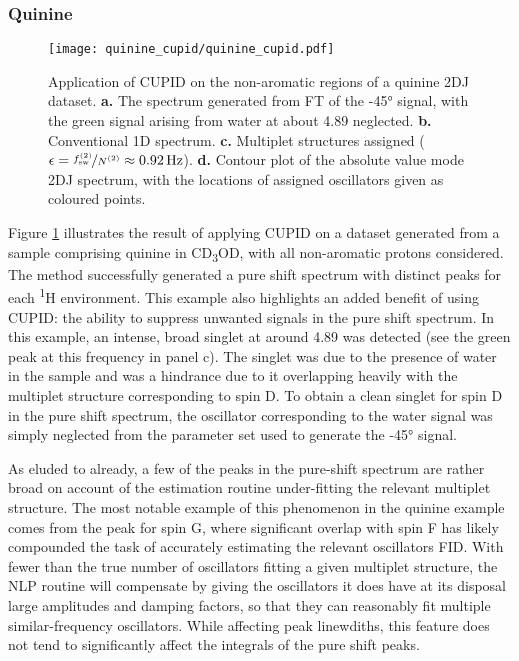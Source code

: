 \subsubsection{Quinine}
\begin{figure}
    \centering
    \texttt{[image: quinine\_cupid/quinine\_cupid.pdf]}
    \caption[
        Application of \acs{CUPID} on the non-aromatic regions of a quinine
        \acs{2DJ} dataset.
    ]{
        Application of \ac{CUPID} on the non-aromatic regions of a quinine
        \ac{2DJ} dataset.
        \textbf{a.} The spectrum generated from \ac{FT} of the \ang{-45}
        signal, with the green signal arising from water at about
        \qty{4.89}{\partspermillion} neglected.
        \textbf{b.} Conventional \ac{1D} spectrum.
        \textbf{c.} Multiplet structures assigned ($\epsilon =
        \nicefrac{f_{\mathrm{sw}}^{(2)}}{N^{(2)}} \approx \qty{0.92}{\hertz}$).
        \textbf{d.} Contour plot of the absolute value mode \ac{2DJ} spectrum,
        with the locations of assigned oscillators given as coloured points.
    }
    \label{fig:quinine-cupid}
\end{figure}

Figure \ref{fig:quinine-cupid} illustrates the result of applying \ac{CUPID} on
a dataset generated from a sample comprising quinine in CD\textsubscript{3}OD,
with all non-aromatic protons considered. The method successfully generated a
pure shift spectrum with distinct peaks for each \textsuperscript{1}H
environment. This example also highlights an added benefit of using \ac{CUPID}:
the ability to suppress unwanted signals in the pure shift spectrum. In this
example, an intense, broad singlet at around \qty{4.89}{\partspermillion}
was detected (see the green peak at this frequency in panel c).
The singlet was due to the presence of water in the sample and was a hindrance
due to it overlapping heavily with the multiplet structure corresponding to
spin D. To obtain a clean singlet for spin D in the pure shift spectrum, the
oscillator corresponding to the water signal was simply neglected from
the parameter set used to
generate the \ang{-45} signal. 

As eluded to already, a few of the peaks in the pure-shift spectrum are rather
broad on account of the estimation routine under-fitting the relevant multiplet
structure. The most notable example of this phenomenon in the quinine example
comes from the peak for spin G, where significant overlap with spin F has likely
compounded the task of accurately estimating the relevant oscillators \ac{FID}. With fewer than the
true number of oscillators fitting a given multiplet structure, the \ac{NLP}
routine will compensate by giving the oscillators it does have at its disposal
large amplitudes and damping factors, so that they can reasonably fit multiple
similar-frequency oscillators.
While affecting peak linewdiths, this feature does not tend to significantly
affect the integrals of the pure shift peaks. 

